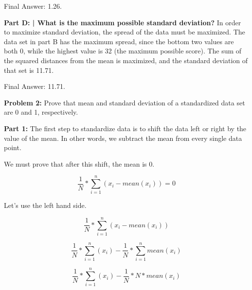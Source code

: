 \documentclass{article}
\begin{document}
Final Answer: 1.26.\newline

\textbf{Part D: | What is the maximum possible standard deviation?}\newline\newline
In order to maximize standard deviation, the spread of the data must be maximized. The data set in part B has the maximum spread, since the bottom two values are both 0, while the highest value is 32 (the maximum possible score). The sum of the squared distances from the mean is maximized, and the standard deviation of that set is 11.71.\newline

Final Answer: 11.71. \newline

\newpage
 
 \noindent\makebox[\linewidth]{\rule{\paperwidth}{0.4pt}}\newline
 
 \begin{center}
      \Large\textbf{Problem 2:} Prove that mean and standard deviation of a standardized data set are 0 and 1, respectively.\par
 \end{center}
 
\textbf{Part 1:} The first step to standardize data is to shift the data left or right by the value of the mean. In other words, we subtract the mean from every single data point.\newline

We must prove that after this shift, the mean is 0.

 \begin{displaymath}
\frac{1}{N} * \sum_{i=1}^{n}(x_{i}-mean({x_{i}})) = 0
\end{displaymath}

Let's use the left hand side.

\begin{equation}
\frac{1}{N} * \sum_{i=1}^{n}(x_{i}-mean({x_{i}}))
\end{equation}
  
\begin{equation}  
\frac{1}{N} * \sum_{i=1}^{n}(x_{i}) - \frac{1}{N} * \sum_{i=1}^{n}mean({x_{i}})
\end{equation}

\begin{equation}  
\frac{1}{N} * \sum_{i=1}^{n}(x_{i}) - \frac{1}{N} * N *mean({x_{i}})
\end{equation}
\end{document}
